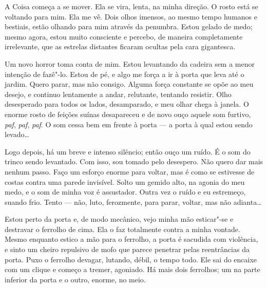 A Coisa começa a se mover. Ela se vira, lenta, na minha direção. O rosto está se voltando para mim. Ela me vê. Dois
olhos imensos, ao mesmo tempo humanos e bestiais, estão olhando para mim através da penumbra. Estou gelado de medo;
mesmo agora, estou muito consciente e percebo, de maneira completamente irrelevante, que as estrelas distantes ficaram
ocultas pela cara gigantesca.

Um novo horror toma conta de mim. Estou levantando da cadeira sem a menor intenção de fazê"-lo. Estou de pé, e algo me
força a ir à porta que leva até o jardim. Quero parar, mas não consigo. Alguma força constante se opõe ao meu desejo, e
continuo lentamente a andar, relutante, tentando resistir. Olho desesperado para todos os lados, desamparado, e meu
olhar chega à janela. O enorme rosto de feições suínas desapareceu e de novo ouço aquele som furtivo, \textit{paf},
\textit{paf}, \textit{paf}. O som cessa bem em frente à porta --- a porta à qual estou sendo levado\ldots{}

Logo depois, há um breve e intenso silêncio; então ouço um ruído. É o som do trinco sendo levantado. Com isso, sou
tomado pelo desespero. Não quero dar mais nenhum passo. Faço um esforço enorme para voltar, mas é como se estivesse de
costas contra uma parede invisível. Solto um gemido alto, na agonia do meu medo, e o som de minha voz é assustador.
Outra vez o ruído e eu estremeço, suando frio. Tento --- não, luto, ferozmente, para parar, voltar, mas não adianta\ldots{}

Estou perto da porta e, de modo mecânico, vejo minha mão esticar"-se e destravar o ferrolho de cima. Ela o faz
totalmente contra a minha vontade. Mesmo enquanto estico a mão para o ferrolho, a porta é sacudida com violência, e
sinto um cheiro repulsivo de mofo que parece penetrar pelas reentrâncias da porta. Puxo o ferrolho devagar, lutando,
débil, o tempo todo. Ele sai do encaixe com um clique e começo a tremer, agoniado. Há mais dois ferrolhos; um na
parte inferior da porta e o outro, enorme, no meio.

